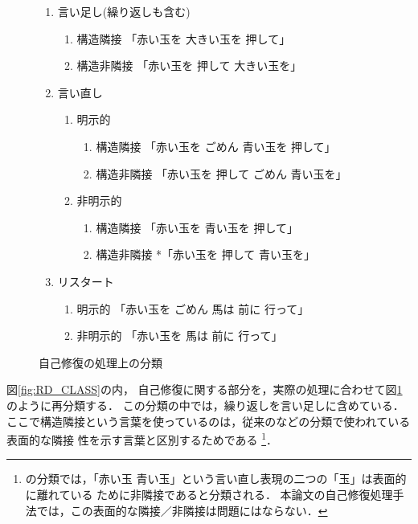 \begin{figure}
\begin{center}
\begin{minipage}{.55\linewidth}
\newcommand{\basesize}{}
\newcommand{\examplesize}{}
\basesize
\begin{enumerate}
\item 言い足し(繰り返しも含む)
  \begin{enumerate}
  \item 構造隣接 \examplesize「赤い玉を 大きい玉を 押して」\basesize
  \item 構造非隣接 \examplesize 「赤い玉を 押して 大きい玉を」\basesize
  \end{enumerate}
\item 言い直し
  \begin{enumerate}
  \item 明示的
    \begin{enumerate}
    \item 構造隣接 \examplesize  「赤い玉を ごめん 青い玉を 押して」\basesize
    \item 構造非隣接  \examplesize 「赤い玉を 押して ごめん 青い玉を」\basesize
    \end{enumerate}
  \item 非明示的
    \begin{enumerate}
    \item 構造隣接  \examplesize 「赤い玉を 青い玉を 押して」\basesize
    \item 構造非隣接  \examplesize  *「赤い玉を 押して 青い玉を」\basesize
    \end{enumerate}
  \end{enumerate}
\item リスタート
  \begin{enumerate}
  \item 明示的  \examplesize 「赤い玉を ごめん 馬は 前に 行って」\basesize
  \item 非明示的 \examplesize  「赤い玉を 馬は 前に 行って」\basesize
  \end{enumerate}
\end{enumerate}
\end{minipage}
\end{center}
\caption{自己修復の処理上の分類}
\label{fig:SC_CLASS}
\end{figure}

図\ref{fig:RD_CLASS}の内，
自己修復に関する部分を，実際の処理に合わせて図\ref{fig:SC_CLASS}のように再分類する．
この分類の中では，繰り返しを言い足しに含めている．
ここで構造隣接という言葉を使っているのは，従来の\cite{KM1996}などの分類で使われている表面的な隣接
性を示す言葉と区別するためである
\footnote{
\cite{KM1996}の分類では，「赤い玉 青い玉」という言い直し表現の二つの「玉」は表面的に離れている
ために非隣接であると分類される．
本論文の自己修復処理手法では，この表面的な隣接／非隣接は問題にはならない．}．

